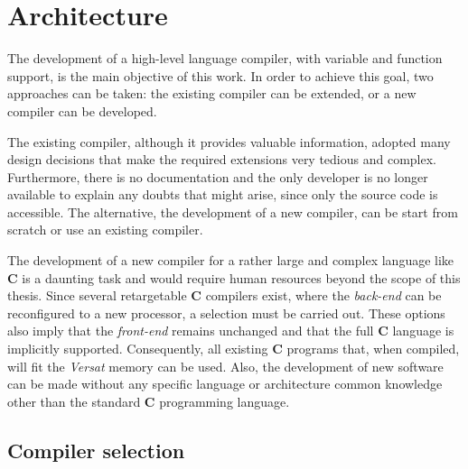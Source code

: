 
\chapter{Architecture}
\label{chapter:arch}

The development of a high-level language compiler, with variable and function
support, is the main objective of this work.  In order to achieve this goal, two
approaches can be taken: the existing compiler can be extended, or a new
compiler can be developed.

The existing compiler, although it provides valuable information, adopted many
design decisions that make the required extensions very tedious and complex.
Furthermore, there is no documentation and the only developer is no longer
available to explain any doubts that might arise, since only the source code is
accessible.  The alternative, the development of a new compiler, can be start
from scratch or use an existing compiler.

The development of a new compiler for a rather large and complex language like
{\bf C} is a daunting task and would require human resources beyond the scope of
this thesis.  Since several retargetable {\bf C} compilers exist, where the
{\it back-end} can be reconfigured to a new processor, a selection must be carried
out.  These options also imply that the {\it front-end} remains unchanged and that
the full {\bf C} language is implicitly supported.  Consequently, all existing
{\bf C} programs that, when compiled, will fit the {\it Versat} memory can be
used.  Also, the development of new software can be made without any specific
language or architecture common knowledge other than the standard {\bf C}
programming language.

\section{Compiler selection}

